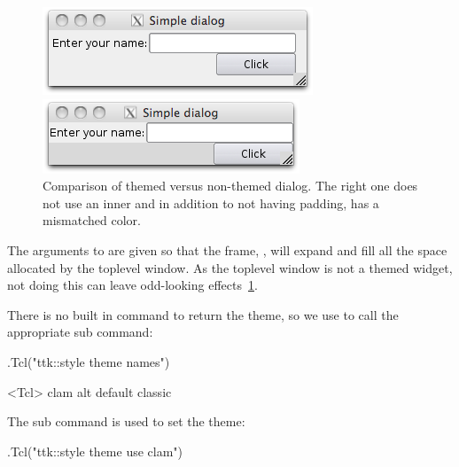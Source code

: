 \begin{figure}
  \centering
  \begin{minipage}[c]{.45\linewidth}
    \includegraphics[width=\textwidth]{fig-tcltk-themed-dialog.png}    
  \end{minipage}\quad
  \begin{minipage}[c]{.45\linewidth}
   \includegraphics[width=\textwidth]{fig-tcltk-non-themed-dialog.png}
 \end{minipage}
 \caption{Comparison of themed versus non-themed dialog. The right
    one does not use an inner  and in addition to not
    having padding, has a mismatched color.}
  \label{fig:tcltk-compare-themed-non-themed}
\end{figure}


The arguments to  are given so that the frame, ,
will expand and fill all the space allocated by the toplevel
window. As the toplevel window is not a themed widget, not doing this
can leave odd-looking effects~\ref{fig:tcltk-compare-themed-non-themed}.

There is no built in command to return the theme, so we use
 to call the appropriate 
sub command:

\begin{Schunk}
\begin{Sinput}
 .Tcl("ttk::style theme names")
\end{Sinput}
\begin{Soutput}
<Tcl> clam alt default classic 
\end{Soutput}
\end{Schunk}
%
The  sub command is used to set the theme:
\begin{Schunk}
\begin{Sinput}
 .Tcl("ttk::style theme use clam")
\end{Sinput}
\end{Schunk}

